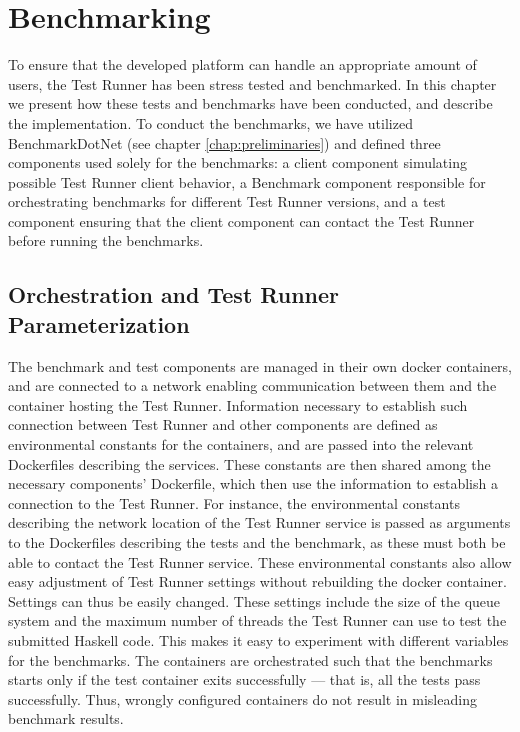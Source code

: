\chapter{Benchmarking} \label{chap:Benchmarking}
To ensure that the developed platform can handle an appropriate amount of users, the Test Runner has been stress tested and benchmarked.
In this chapter we present how these tests and benchmarks have been conducted, and describe the implementation. To conduct the benchmarks, we have utilized BenchmarkDotNet (see chapter \ref{chap:preliminaries}) and defined three components used solely for the benchmarks:
a client component simulating possible Test Runner client behavior, a Benchmark component responsible for orchestrating benchmarks for different Test Runner versions, and a test component ensuring that the client component can contact the Test Runner before running the benchmarks.

\section{Orchestration and Test Runner Parameterization}
The benchmark and test components are managed in their own docker containers, and are connected to a network enabling communication between them and the container hosting the Test Runner.
Information necessary to establish such connection between Test Runner and other components are defined as environmental constants for the containers, and are passed into the relevant Dockerfiles describing the services.
These constants are then shared among the necessary components' Dockerfile, which then use the information to establish a connection to the Test Runner.
For instance, the environmental constants describing the network location of the Test Runner service is passed as arguments to the Dockerfiles describing the tests and the benchmark, as these must both be able to contact the Test Runner service.
These environmental constants also allow easy adjustment of Test Runner settings without rebuilding the docker container.
Settings can thus be easily changed.
These settings include the size of the queue system and the maximum number of threads the Test Runner can use to test the submitted Haskell code.
This makes it easy to experiment with different variables for the benchmarks.
The containers are orchestrated such that the benchmarks starts only if the test container exits successfully --- that is, all the tests pass successfully.
Thus, wrongly configured containers do not result in misleading benchmark results.

